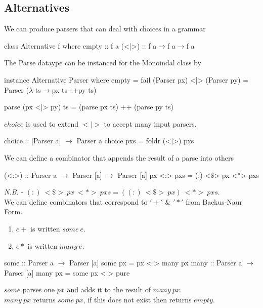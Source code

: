\documentclass[11pt,a4paper]{article}
\begin{document}
\subsection{Alternatives}

We can produce parsers that can deal with choices in a grammar
\begin{code}
class Alternative f
  where
    empty :: f a
    (<|>) :: f a$\to$f a$\to$f a
\end{code}

The Parse dataype can be instanced for the Monoindal class by
\begin{code}
instance Alternative Parser
  where
    empty = fail
    (Parser px) <|> (Parser py) = Parser ($\lambda$ ts$\to$px ts++py ts)
\end{code}

\begin{code}
parse (px <|> py) ts = (parse px ts) ++ (parse py ts)
\end{code}

$choice$ is used to extend $<|>$ to accept many input parsers.
\begin{code}
choice :: [Parser a] $\to$ Parser a
choice pxs = foldr (<|>) pxs
\end{code}

We can define a combinator that appends the result of a parse into others
\begin{code}
(<:>) :: Parser a $\to$ Parser [a] $\to$ Parser [a]
px <:> pxs = (:) <$\mathdollar$> px <*> pxs
\end{code}
\textit{N.B.} - $(:)\ <\mathdollar>\ px\ <*>\ pxs = \left((:)\ <\mathdollar>\ px\right)\ <*>\ pxs$.\\

We can define combinators that correspond to $'+'$ \& $'*'$ from Backus-Naur Form.
\begin{enumerate}[label=\roman*)]
  \item $e+$ is written $some\ e$.
  \item $e*$ is written $many\ e$.
\end{enumerate}
\begin{code}
some :: Parser a $\to$ Parser [a]
some px = px <:> many px
many :: Parser a $\to$ Parser [a]
many px = some px <|> pure
\end{code}
$some$ parses one $px$ and adds it to the result of $many\ px$.\\
$many\ px$ returns $some\ px$, if this does not exist then returns $empty$.
\end{document}
